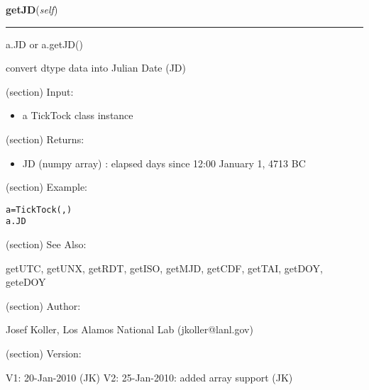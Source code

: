     \label{spacepy:spacetime:TickTock:getJD}

    \vspace{0.5ex}

\hspace{.8\funcindent}\begin{boxedminipage}{\funcwidth}

    \raggedright \textbf{getJD}(\textit{self})

    \vspace{-1.5ex}

    \rule{\textwidth}{0.5\fboxrule}
\setlength{\parskip}{2ex}
    a.JD or a.getJD()

    convert dtype data into Julian Date (JD)

    (section) Input:

      \begin{itemize}
      \setlength{\parskip}{0.6ex}
        \item a TickTock class instance

      \end{itemize}

    (section) Returns:

      \begin{itemize}
      \setlength{\parskip}{0.6ex}
        \item JD (numpy array) : elapsed days since 12:00 January 1, 4713 BC

      \end{itemize}

    (section) Example:

\begin{alltt}
\pysrcprompt{{\textgreater}{\textgreater}{\textgreater} }a = TickTock(, )
\pysrcprompt{{\textgreater}{\textgreater}{\textgreater} }a.JD
\end{alltt}
    (section) See Also:

      getUTC, getUNX, getRDT, getISO, getMJD, getCDF, getTAI, getDOY, 
      geteDOY

    (section) Author:

      Josef Koller, Los Alamos National Lab (jkoller@lanl.gov)

    (section) Version:

      V1: 20-Jan-2010 (JK) V2: 25-Jan-2010: added array support (JK)

\setlength{\parskip}{1ex}
    \end{boxedminipage}

